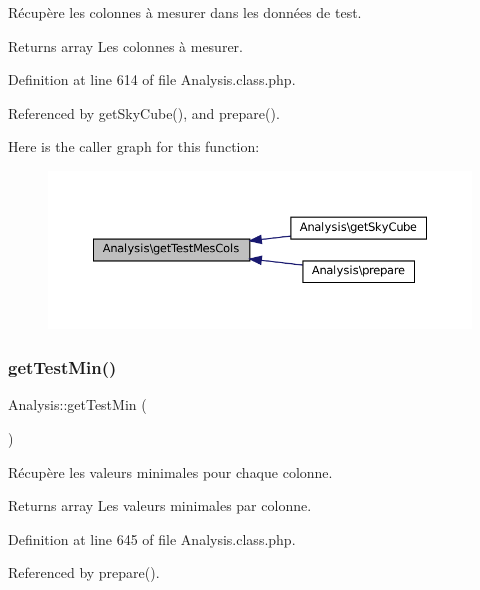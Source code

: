 Récupère les colonnes à mesurer dans les données de test.

\begin{DoxyReturn}{Returns}
array Les colonnes à mesurer. 
\end{DoxyReturn}


Definition at line 614 of file Analysis.\+class.\+php.



Referenced by get\+Sky\+Cube(), and prepare().

Here is the caller graph for this function\+:\nopagebreak
\begin{figure}[H]
\begin{center}
\leavevmode
\includegraphics[width=350pt]{class_analysis_aa52531fa97647772150dd607133bd355_icgraph}
\end{center}
\end{figure}
\mbox{\label{class_analysis_ae60332a39d4ae552bf601a683a219f09}} 
\subsubsection{\texorpdfstring{get\+Test\+Min()}{getTestMin()}}
{\footnotesize\ttfamily Analysis\+::get\+Test\+Min (\begin{DoxyParamCaption}{ }\end{DoxyParamCaption})\hspace{0.3cm}{\ttfamily [protected]}}

Récupère les valeurs minimales pour chaque colonne.

\begin{DoxyReturn}{Returns}
array Les valeurs minimales par colonne. 
\end{DoxyReturn}


Definition at line 645 of file Analysis.\+class.\+php.



Referenced by prepare().

